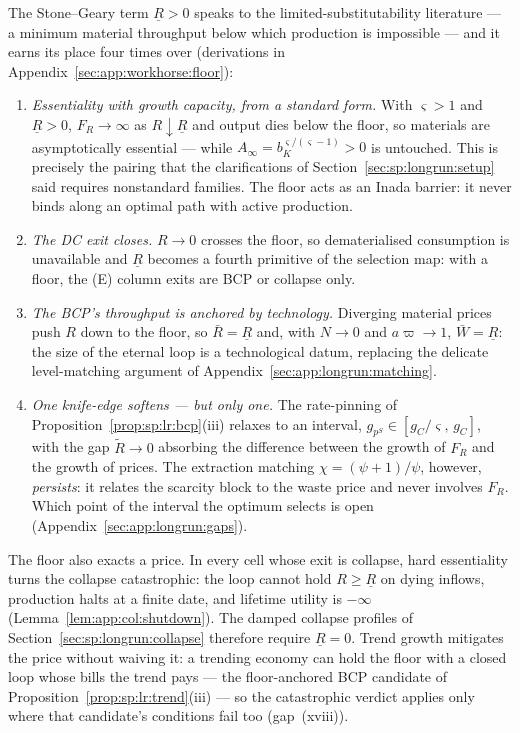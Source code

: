  The Stone--Geary term $\underline R>0$ speaks to the
limited-substitutability literature --- a minimum material throughput below which production
is impossible --- and it earns its place four times over
(derivations in Appendix~\ref{sec:app:workhorse:floor}):
\begin{enumerate}
    \item \emph{Essentiality with growth capacity, from a standard form.} With $\varsigma>1$
    and $\underline R>0$, $F_R\to\infty$ as $R\downarrow\underline R$ and output dies below the
    floor, so materials are asymptotically essential --- while
    $A_\infty=b_K^{\varsigma/\left(\varsigma-1\right)}>0$ is untouched. This is precisely the
    pairing that the clarifications of Section~\ref{sec:sp:longrun:setup} said requires
    nonstandard families. The floor acts as an Inada barrier: it never binds along an optimal
    path with active production.
    \item \emph{The DC exit closes.} $R\to0$ crosses the floor, so dematerialised consumption
    is unavailable and $\underline R$ becomes a fourth primitive of the selection map: with a
    floor, the (E) column exits are BCP or collapse only.
    \item \emph{The BCP's throughput is anchored by technology.} Diverging material prices
    push $R$ down to the floor, so $\bar R=\underline R$ and, with $N\to0$ and
    $a\varpi\to1$, $\bar W=\underline R$: the size of the eternal loop is a technological
    datum, replacing the delicate level-matching argument of
    Appendix~\ref{sec:app:longrun:matching}.
    \item \emph{One knife-edge softens --- but only one.} The rate-pinning of
    Proposition~\ref{prop:sp:lr:bcp}(iii) relaxes to an interval,
    $g_{p^S}\in\left[g_C/\varsigma,\,g_C\right]$, with the gap $\tilde R\to0$ absorbing the
    difference between the growth of $F_R$ and the growth of prices. The extraction matching
    $\chi=\left(\psi+1\right)/\psi$, however, \emph{persists}: it relates the scarcity block to
    the waste price and never involves $F_R$. Which point of the interval the optimum selects
    is open (Appendix~\ref{sec:app:longrun:gaps}).
\end{enumerate}
The floor also exacts a price. In every cell whose exit is collapse, hard essentiality turns
the collapse catastrophic: the loop cannot hold $R\ge\underline R$ on dying inflows,
production halts at a finite date, and lifetime utility is $-\infty$
(Lemma~\ref{lem:app:col:shutdown}). The damped collapse profiles of
Section~\ref{sec:sp:longrun:collapse} therefore require $\underline R=0$. Trend growth
mitigates the price without waiving it: a trending economy can hold the floor with a closed
loop whose bills the trend pays --- the floor-anchored BCP candidate of
Proposition~\ref{prop:sp:lr:trend}(iii) --- so the catastrophic verdict applies only where
that candidate's conditions fail too (gap~(xviii)).


